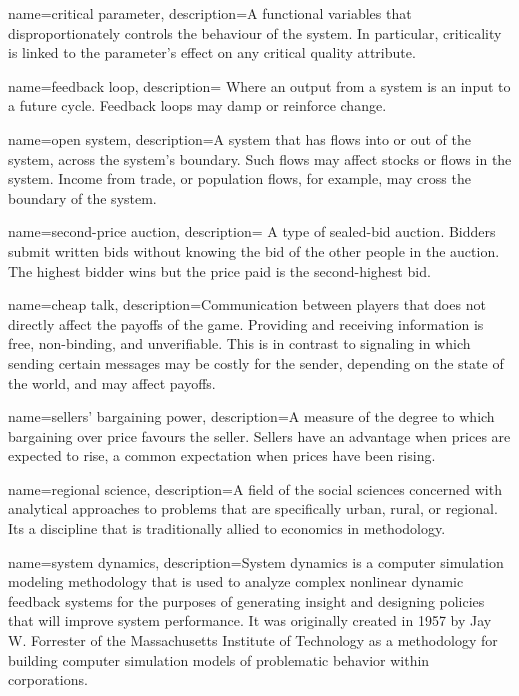 {
name=critical parameter,
description={A functional variables that disproportionately controls the behaviour of the system. In particular, criticality is linked to the parameter's effect on any critical quality attribute. %
}
}

{
name=feedback loop,
description={%
Where an output from a system is an input to a future cycle. Feedback loops may damp or reinforce change.}
}

{
name=open system,
description={A %
system that has flows into or out of the system, across the system's boundary. %
Such flows may affect stocks or flows in the system. Income from trade, or population flows, for example, may cross the boundary of the system.}
}

{
name=second-price auction,
description={%
A type of sealed-bid auction. Bidders submit written bids without knowing the bid of the other people in the auction. The highest bidder wins but the price paid is the second-highest bid.}
}

{
name=cheap talk,
description={Communication between players that does not directly affect the payoffs of the game. Providing and receiving information is free, non-binding, and unverifiable. This is in contrast to signaling in which sending certain messages may be costly for the sender, depending on the state of the world, and may affect payoffs.}
}

{
name=sellers' bargaining power,
description={A measure of the degree to which bargaining over price favours the seller. Sellers have an advantage when prices are expected to rise, a common expectation when prices have been rising.}
}

{
name=regional science,
description={A field of the social sciences concerned with analytical approaches to problems that are specifically urban, rural, or regional. Its a discipline that is traditionally allied to economics in methodology.}
}

{
name=system dynamics,
description={System dynamics is a computer simulation modeling methodology that is used to analyze complex nonlinear dynamic feedback systems for the purposes of generating insight and designing policies that will improve system performance. It was originally created in 1957 by Jay W. Forrester of the Massachusetts Institute of Technology as a methodology for building computer simulation models of problematic behavior within corporations.}
}

